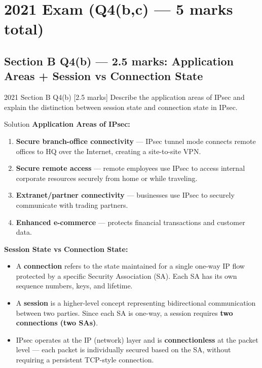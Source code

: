 \documentclass[12pt,a4paper]{article}
\begin{document}
\vspace{1em}

\section{2021 Exam (Q4(b,c) --- 5 marks total)}

\subsection{Section B Q4(b) --- 2.5 marks: Application Areas + Session vs Connection State}

\begin{qbox}{2021 Section B Q4(b) [2.5 marks]}
  Describe the application areas of IPsec and explain the distinction between session state and connection state in IPsec.
\end{qbox}

\begin{solbox}{Solution}
\textbf{Application Areas of IPsec:}
\begin{enumerate}[nosep]
  \item \textbf{Secure branch-office connectivity} --- IPsec tunnel mode connects remote offices to HQ over the Internet, creating a site-to-site VPN.
  \item \textbf{Secure remote access} --- remote employees use IPsec to access internal corporate resources securely from home or while traveling.
  \item \textbf{Extranet/partner connectivity} --- businesses use IPsec to securely communicate with trading partners.
  \item \textbf{Enhanced e-commerce} --- protects financial transactions and customer data.
\end{enumerate}

\bigskip
\textbf{Session State vs Connection State:}
\begin{itemize}[nosep]
  \item A \textbf{connection} refers to the state maintained for a single one-way IP flow protected by a specific Security Association (SA). Each SA has its own sequence numbers, keys, and lifetime.
  \item A \textbf{session} is a higher-level concept representing bidirectional communication between two parties. Since each SA is one-way, a session requires \textbf{two connections (two SAs)}.
  \item IPsec operates at the IP (network) layer and is \textbf{connectionless} at the packet level --- each packet is individually secured based on the SA, without requiring a persistent TCP-style connection.
\end{itemize}
\end{solbox}
\end{document}
